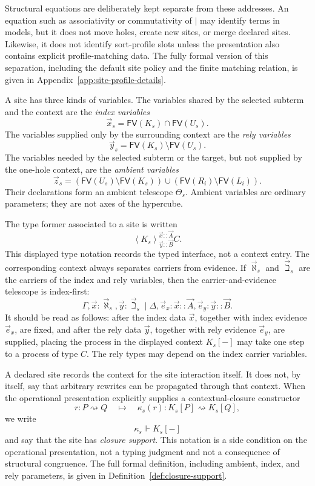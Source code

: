 \documentclass[11pt]{article}
\newcommand{\rw}{\rightsquigarrow}
\newcommand{\ty}{\mathrel{::}}
\newcommand{\FV}{\mathsf{FV}}
\newcommand{\Mod}[4]{\left\langle #1\right\rangle^{#2}_{#3} #4}
\begin{document}
Structural equations are deliberately kept separate from these addresses.  An
equation such as associativity or commutativity of \(\mid\) may identify terms in
models, but it does not move holes, create new sites, or merge declared sites.
Likewise, it does not identify sort-profile slots unless the presentation also
contains explicit profile-matching data.  The fully formal version of this
separation, including the default site policy and the finite matching relation,
is given in Appendix~\ref{app:site-profile-details}.

A site has three kinds of variables.  The variables shared by the selected
subterm and the context are the \emph{index variables}
\[
  \vec x_s=\FV(K_s)\cap\FV(U_s).
\]
The variables supplied only by the surrounding context are the \emph{rely
variables}
\[
  \vec y_s=\FV(K_s)\setminus\FV(U_s).
\]
The variables needed by the selected subterm or the target, but not supplied by
the one-hole context, are the \emph{ambient variables}
\[
  \vec z_s=
  (\FV(U_s)\setminus\FV(K_s))\cup(\FV(R_i)\setminus\FV(L_i)).
\]
Their declarations form an ambient telescope \(\Theta_s\).  Ambient variables
are ordinary parameters; they are not axes of the hypercube.

The type former associated to a site is written
\[
  \Mod{K_s}{\vec x\ty\vec A}{\vec y\ty\vec B}{C}.
\]
This displayed type notation records the typed interface, not a context entry.
The corresponding context always separates carriers from evidence.  If
\(\vec \aleph_s\) and \(\vec \beth_s\) are the carriers of the index and rely variables,
then the carrier-and-evidence telescope is index-first:
\[
  \Gamma,\vec x:\vec \aleph_s,\vec y:\vec \beth_s
  \mid
  \Delta,\vec e_x:\vec x\ty\vec A,\vec e_y:\vec y\ty\vec B.
\]
It should be read as follows: after the index data \(\vec x\), together with
index evidence \(\vec e_x\), are fixed, and after the rely data \(\vec y\),
together with rely evidence \(\vec e_y\), are supplied, placing the process in
the displayed context \(K_s[-]\) may take one step to a process of type \(C\).
The rely types may depend on the index carrier variables.

A declared site records the context for the site interaction itself.  It does
not, by itself, say that arbitrary rewrites can be propagated through that
context.  When the operational presentation explicitly supplies a
contextual-closure constructor
\[
  r:P\rw Q
  \quad\longmapsto\quad
  \kappa_s(r):K_s[P]\rw K_s[Q],
\]
we write
\[
  \kappa_s\Vdash K_s[-]
\]
and say that the site has \emph{closure support}.  This notation is a side
condition on the operational presentation, not a typing judgment and not a
consequence of structural congruence.  The full formal definition, including
ambient, index, and rely parameters, is given in
Definition~\ref{def:closure-support}.
\end{document}
